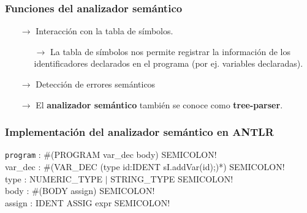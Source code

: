 \documentclass{beamer}
\begin{document}
		\begin{frame}
			\frametitle{Funciones del analizador sem\'antico}

            \begin{block}{}
                \begin{itemize}
                    \item[$\rightarrow$] Interacci\'on con la tabla de s\'imbolos.
                    \begin{itemize}
                        \item[$\rightarrow$] La tabla de s\'imbolos nos permite registrar la informaci\'on de los identificadores declarados en el programa (por ej. variables declaradas).
                    \end{itemize}
                \end{itemize}
            \end{block}
            \begin{block}{}
                 \begin{itemize}
                    \item[$\rightarrow$] Detecci\'on de errores sem\'anticos
                 \end{itemize}
            \end{block}
            \begin{block}{}
                 \begin{itemize}
                    \item[$\rightarrow$] El \textbf{analizador sem\'antico} tambi\'en se conoce como \textbf{tree-parser}.
                 \end{itemize}
            \end{block}
		\end{frame}		

		\begin{frame}
			\frametitle{Implementaci\'on del analizador sem\'antico en ANTLR}

            \begin{block}{}
                \texttt{program} : \#(PROGRAM var\_dec body) SEMICOLON!\\
                \vspace{5pt}
                var\_dec : \#(VAR\_DEC (type id:IDENT {sI.addVar(id);})*) SEMICOLON!\\
                \vspace{5pt}
                type : NUMERIC\_TYPE $|$ STRING\_TYPE SEMICOLON! \\
                \vspace{5pt}
                body : \#(BODY assign) SEMICOLON! \\
                \vspace{5pt}
                assign : IDENT ASSIG expr SEMICOLON! \\
			\end{block}
		\end{frame}
\end{document}
